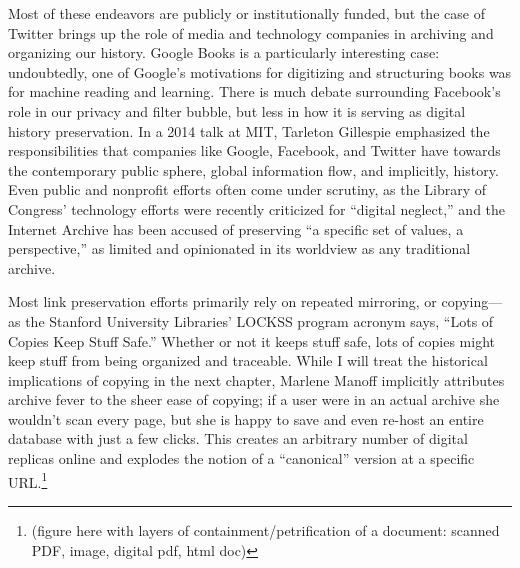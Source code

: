 

Most of these endeavors are publicly or institutionally funded, but the case of Twitter brings up the role of media and technology companies in archiving and organizing our history. Google Books is a particularly interesting case: undoubtedly, one of Google's motivations for digitizing and structuring books was for machine reading and learning. There is much debate surrounding Facebook's role in our privacy and filter bubble, but less in how it is serving as digital history preservation. In a 2014 talk at MIT, Tarleton Gillespie emphasized the responsibilities that companies like Google, Facebook, and Twitter have towards the contemporary public sphere, global information flow, and implicitly, history.\autocite{whitacre_podcast:_2014} Even public and nonprofit efforts often come under scrutiny, as the Library of Congress' technology efforts were recently criticized for ``digital neglect,'' and the Internet Archive has been accused of preserving ``a specific set of values, a perspective,'' as limited and opinionated in its worldview as any traditional archive.\autocite{the_editorial_board_digital_2015,abreu_collection_2015}

Most link preservation efforts primarily rely on repeated mirroring, or copying---as the Stanford University Libraries' LOCKSS program acronym says, ``Lots of Copies Keep Stuff Safe.''\autocite[2778]{zittrain_fourth_2010} Whether or not it keeps stuff safe, lots of copies might keep stuff from being organized and traceable. While I will treat the historical implications of copying in the next chapter, Marlene Manoff implicitly attributes archive fever to the sheer ease of copying; if a user were in an actual archive she wouldn’t scan every page, but she is happy to save and even re-host an entire database with just a few clicks.\autocite[386]{manoff_archive_2010} This creates an arbitrary number of digital replicas online and explodes the notion of a ``canonical'' version at a specific URL.\footnote{(figure here with layers of containment/petrification of a document: scanned PDF, image, digital pdf, html doc)}

